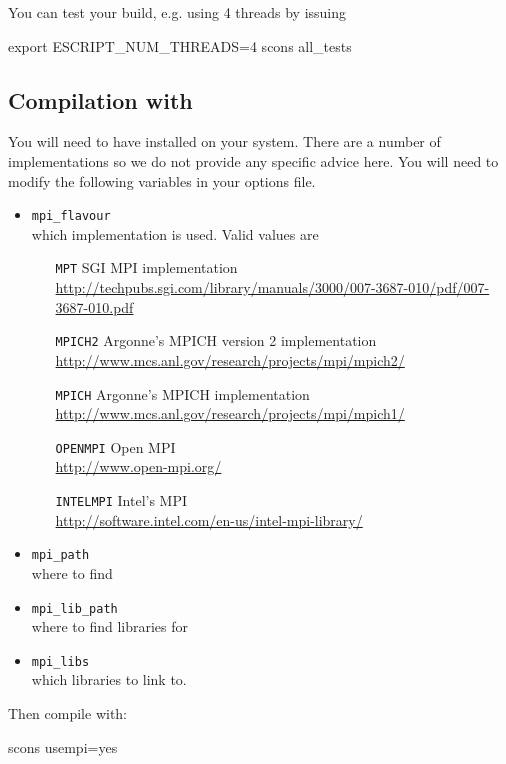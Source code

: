 You can test your build, e.g. using 4 threads by issuing
\begin{shellCode}
export ESCRIPT_NUM_THREADS=4
scons all_tests
\end{shellCode}

\subsection{Compilation with \mpi}
You will need to have \mpi installed on your system.
There are a number of implementations so we do not provide any specific advice here.
You will need to modify the following variables in your options file.
\begin{itemize}
 \item \texttt{mpi_flavour} \\
	which \mpi implementation is used. Valid values are
    \begin{itemize}
        \item[\texttt{MPT}] SGI MPI implementation \\
            \url{http://techpubs.sgi.com/library/manuals/3000/007-3687-010/pdf/007-3687-010.pdf}
        \item[\texttt{MPICH2}] Argonne's MPICH version 2 implementation \\
            \url{http://www.mcs.anl.gov/research/projects/mpi/mpich2/}
        \item[\texttt{MPICH}] Argonne's MPICH implementation \\
            \url{http://www.mcs.anl.gov/research/projects/mpi/mpich1/}
        \item[\texttt{OPENMPI}] Open MPI \\
            \url{http://www.open-mpi.org/}
        \item[\texttt{INTELMPI}] Intel's MPI \\
            \url{http://software.intel.com/en-us/intel-mpi-library/}
    \end{itemize}
 \item \texttt{mpi_path} \\
	where to find 
 \item \texttt{mpi_lib_path} \\
	where to find libraries for \mpi
 \item \texttt{mpi_libs} \\
	which libraries to link to.
\end{itemize}

Then compile with:
\begin{shellCode}
 scons usempi=yes
\end{shellCode}

